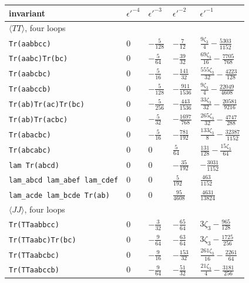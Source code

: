 \begin{center}\small
\begin{longtable}{lllll}
\toprule
invariant & $\epsilon'^{-4}$ & $\epsilon'^{-3}$ & $\epsilon'^{-2}$ & $\epsilon'^{-1}$\\ \midrule
\endhead
\multicolumn{5}{l}{$\langle TT\rangle$, four loops}\\
\texttt{Tr(aabbcc)} & $0$ & $- \frac{5}{128}$ & $- \frac{7}{12}$ & $\frac{9 \zeta_3}{4} - \frac{5303}{1152}$\\
\texttt{Tr(aabc)Tr(bc)} & $0$ & $- \frac{5}{64}$ & $- \frac{39}{32}$ & $\frac{69 \zeta_3}{16} - \frac{7705}{768}$\\
\texttt{Tr(aabcbc)} & $0$ & $- \frac{5}{16}$ & $- \frac{141}{32}$ & $\frac{555 \zeta_3}{32} - \frac{4223}{128}$\\
\texttt{Tr(aabccb)} & $0$ & $- \frac{5}{128}$ & $- \frac{911}{1536}$ & $\frac{9 \zeta_3}{4} - \frac{22049}{4608}$\\
\texttt{Tr(ab)Tr(ac)Tr(bc)} & $0$ & $- \frac{5}{256}$ & $- \frac{443}{1536}$ & $\frac{33 \zeta_3}{32} - \frac{20581}{9216}$\\
\texttt{Tr(ab)Tr(acbc)} & $0$ & $- \frac{5}{32}$ & $- \frac{1697}{768}$ & $\frac{265 \zeta_3}{32} - \frac{4747}{288}$\\
\texttt{Tr(abacbc)} & $0$ & $- \frac{5}{16}$ & $- \frac{781}{192}$ & $\frac{133 \zeta_3}{8} - \frac{32387}{1152}$\\
\texttt{Tr(abcabc)} & $0$ & $0$ & $\frac{5}{64}$ & $\frac{131}{128} - \frac{15 \zeta_3}{64}$\\
\texttt{lam Tr(abcd)} & $0$ & $0$ & $- \frac{35}{192}$ & $- \frac{3031}{1152}$\\
\texttt{lam\_abcd lam\_abef lam\_cdef} & $0$ & $0$ & $\frac{5}{192}$ & $\frac{463}{1152}$\\
\texttt{lam\_acde lam\_bcde Tr(ab)} & $0$ & $0$ & $\frac{95}{4608}$ & $\frac{4631}{13824}$\\
\multicolumn{5}{l}{$\langle JJ\rangle$, four loops}\\
\texttt{Tr(TTaabbcc)} & $0$ & $- \frac{3}{32}$ & $- \frac{65}{64}$ & $3 \zeta_3 - \frac{965}{128}$\\
\texttt{Tr(TTaabc)Tr(bc)} & $0$ & $- \frac{9}{64}$ & $- \frac{63}{64}$ & $3 \zeta_3 - \frac{1725}{256}$\\
\texttt{Tr(TTaabcbc)} & $0$ & $- \frac{9}{16}$ & $- \frac{153}{32}$ & $\frac{261 \zeta_3}{16} - \frac{2261}{64}$\\
\texttt{Tr(TTaabccb)} & $0$ & $- \frac{9}{64}$ & $- \frac{51}{32}$ & $\frac{21 \zeta_3}{4} - \frac{3181}{256}$\\

\end{longtable}
\end{center}
